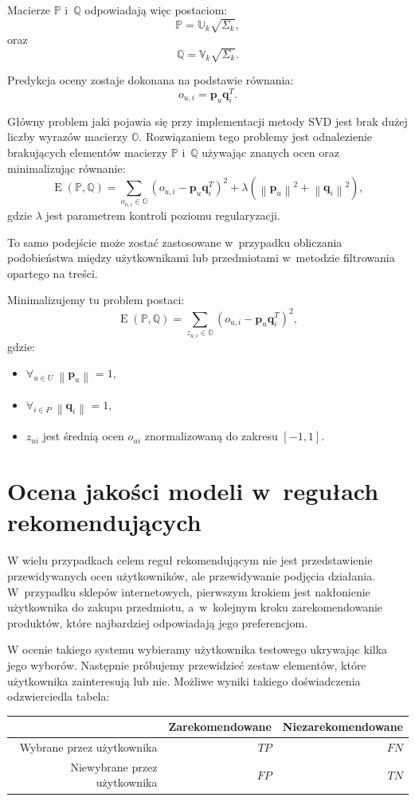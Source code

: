 \documentclass[12pt,a4paper]{report}
\newcommand{\norm}[2][]{\left\| {#2} \right\|_{#1}}
\newcommand{\e}[1]{\operatorname{E}\left({#1} \right)}
\begin{document}
Macierze $\mathbb{P}$ i~$\mathbb{Q}$ odpowiadają więc postaciom:
$$
\mathbb{P}=\mathbb{U}_k \sqrt{\Sigma_k},
$$
oraz 
$$
\mathbb{Q}=\mathbb{V}_k \sqrt{\Sigma_k}.
$$

Predykcja oceny zostaje dokonana na podstawie równania:
$$
o_{u,i} = \mathbf{p}_u \mathbf{q}_i^T.
$$

Główny problem jaki pojawia się przy implementacji metody SVD jest brak dużej liczby wyrazów macierzy $\mathbb{O}$. 
Rozwiązaniem tego problemy jest odnalezienie brakujących elementów macierzy $\mathbb{P}$ i~$\mathbb{Q}$ używając znanych ocen oraz minimalizując równanie:
$$
\e{\mathbb{P}, \mathbb{Q}} = \sum_{o_{u,i} \in \mathbb{O}}(o_{u,i} - \mathbf{p}_u\mathbf{q}_i^T)^2 + \lambda(\norm{\mathbf{p}_u}^2 + \norm{\mathbf{q}_i}^2),
$$
gdzie $\lambda$ jest parametrem kontroli poziomu regularyzacji.

To samo podejście może zostać zastosowane w~przypadku obliczania podobieństwa między użytkownikami lub przedmiotami w~metodzie filtrowania opartego na treści.

Minimalizujemy tu problem postaci:
$$
\e{\mathbb{P}, \mathbb{Q}} = \sum_{z_{u,i} \in \mathbb{O}}(o_{u,i} - \mathbf{p}_u\mathbf{q}_i^T)^2,
$$
gdzie:
\begin{itemize}
\item $\forall_{u \in \mathit{U}} \: \norm{\mathbf{p}_u} = 1$,
\item $\forall_{i \in \mathit{P}} \: \norm{\mathbf{q}_i} = 1$,
\item $z_{ui}$ jest średnią ocen $o_{ui}$ znormalizowaną do zakresu $[-1,1]$.
\end{itemize}

\section{Ocena jakości modeli w~regułach rekomendujących}
W wielu przypadkach celem reguł rekomendującym nie jest przedstawienie przewidywanych ocen użytkowników, ale przewidywanie podjęcia działania. W~przypadku sklepów internetowych, pierwszym krokiem jest nakłonienie użytkownika do zakupu przedmiotu, a~w~kolejnym kroku zarekomendowanie produktów, które najbardziej odpowiadają jego preferencjom.

W ocenie takiego systemu wybieramy użytkownika testowego ukrywając kilka jego wyborów. Następnie próbujemy przewidzieć zestaw elementów, które użytkownika zainteresują lub nie. Możliwe wyniki takiego doświadczenia odzwierciedla tabela:
\begin{table}[H]
\begin{center}
\begin{tabular}{|r|r|r|} \hline
 & Zarekomendowane & Niezarekomendowane\\
\hline
Wybrane przez użytkownika & $TP$ & $FN$ \\
\hline
Niewybrane przez użytkownika & $FP$ & $TN$  \\
\hline
\end{tabular}
\end{center}
\end{table}
\end{document}
